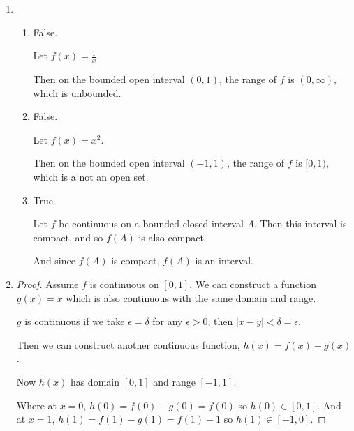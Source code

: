 \documentclass[12pt,letterpaper]{article}
\begin{document}
\begin{enumerate}
\begin{enumerate}
\begin{proof}
            Given Theorem 4.5.2, $f(E)$ is also connected.

            If we have some $L$ between $f(a)$ and $f(b)$,
            then $L \in f(E)$.
            And if $L \in f(E)$ there must be some $c \in E$ such that $f(c) = L$.

            This is the Intermediate Value Theorem.
          \end{proof}
        \item
          \begin{enumerate}
            \item False.

              Let $f(x) = \frac{1}{x}$.

              Then on the bounded open interval $(0, 1)$,
              the range of $f$ is $(0, \infty)$, which is unbounded.
            \item False.

              Let $f(x) = x^2$.

              Then on the bounded open interval $(-1, 1)$,
              the range of $f$ is $[0, 1)$, which is a not an open set.
            \item True.

              Let $f$ be continuous on a bounded closed interval $A$.
              Then this interval is compact, and so $f(A)$ is also compact.

              And since $f(A)$ is compact, $f(A)$ is an interval.
          \end{enumerate}
        \setcounter{enumii}{6}
        \item
          \begin{proof}
            Assume $f$ is continuous on $[0, 1]$.
            We can construct a function $g(x) = x$ which is also continuous with the same domain and range.

            $g$ is continuous if we take $\epsilon = \delta$ for any $\epsilon > 0$, then $|x - y| < \delta = \epsilon$.

            Then we can construct another continuous function, $h(x) = f(x) - g(x)$.

            Now $h(x)$ has domain $[0, 1]$ and range $[-1, 1]$.

            Where at $x = 0$, $h(0) = f(0) - g(0) = f(0)$ so $h(0) \in [0, 1]$.
            And at $x = 1$, $h(1) = f(1) - g(1) = f(1) - 1$ so $h(1) \in [-1, 0]$.


\end{proof}
\end{enumerate}
\end{enumerate}
\end{document}
